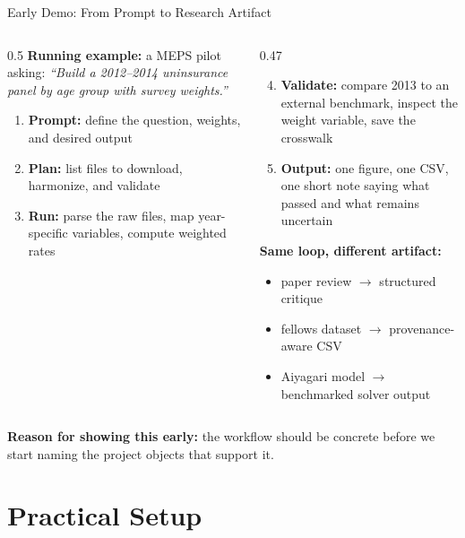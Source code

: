 \documentclass[10pt,english,aspectratio=169]{beamer}
\begin{document}
\begin{frame}{Early Demo: From Prompt to Research Artifact}
\begin{columns}[T]
\begin{column}{0.5\textwidth}
\textbf{Running example:} a MEPS pilot asking:
\textit{``Build a 2012--2014 uninsurance panel by age group with survey weights.''}

\vspace{0.2cm}
\begin{enumerate}
    \item \textbf{Prompt:} define the question, weights, and desired output
    \item \textbf{Plan:} list files to download, harmonize, and validate
    \item \textbf{Run:} parse the raw files, map year-specific variables, compute weighted rates
\end{enumerate}
\end{column}
\begin{column}{0.47\textwidth}
\begin{enumerate}
    \setcounter{enumi}{3}
    \item \textbf{Validate:} compare 2013 to an external benchmark, inspect the weight variable, save the crosswalk
    \item \textbf{Output:} one figure, one CSV, one short note saying what passed and what remains uncertain
\end{enumerate}

\vspace{0.25cm}
\textbf{Same loop, different artifact:}
\begin{itemize}
    \item paper review $\rightarrow$ structured critique
    \item fellows dataset $\rightarrow$ provenance-aware CSV
    \item Aiyagari model $\rightarrow$ benchmarked solver output
\end{itemize}
\end{column}
\end{columns}

\vspace{0.25cm}
\textbf{Reason for showing this early:} the workflow should be concrete before we start naming the project objects that support it.
\end{frame}

\section{Practical Setup}
\end{document}
